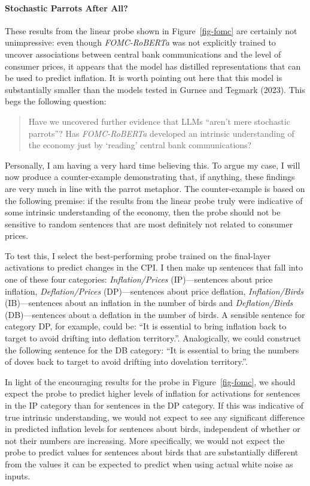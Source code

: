 \documentclass[
  letterpaper,
  DIV=11,
  numbers=noendperiod]{scrartcl}
\let\oldparagraph\paragraph
\renewcommand{\paragraph}[1]{\oldparagraph{#1}\mbox{}}
\theoremstyle{plain}
\theoremstyle{remark}
\begin{document}
\paragraph{Stochastic Parrots After
All?}\label{stochastic-parrots-after-all}

These results from the linear probe shown in Figure~\ref{fig-fomc} are
certainly not unimpressive: even though \emph{FOMC-RoBERTa} was not
explicitly trained to uncover associations between central bank
communications and the level of consumer prices, it appears that the
model has distilled representations that can be used to predict
inflation. It is worth pointing out here that this model is
substantially smaller than the models tested in Gurnee and Tegmark
(2023). This begs the following question:

\begin{quote}
Have we uncovered further evidence that LLMs ``aren't mere stochastic
parrots''? Has \emph{FOMC-RoBERTa} developed an intrinsic understanding
of the economy just by `reading' central bank communications?
\end{quote}

Personally, I am having a very hard time believing this. To argue my
case, I will now produce a counter-example demonstrating that, if
anything, these findings are very much in line with the parrot metaphor.
The counter-example is based on the following premise: if the results
from the linear probe truly were indicative of some intrinsic
understanding of the economy, then the probe should not be sensitive to
random sentences that are most definitely not related to consumer
prices.

To test this, I select the best-performing probe trained on the
final-layer activations to predict changes in the CPI. I then make up
sentences that fall into one of these four categories:
\emph{Inflation/Prices} (IP)---sentences about price inflation,
\emph{Deflation/Prices} (DP)---sentences about price deflation,
\emph{Inflation/Birds} (IB)---sentences about an inflation in the number
of birds and \emph{Deflation/Birds} (DB)---sentences about a deflation
in the number of birds. A sensible sentence for category DP, for
example, could be: ``It is essential to bring inflation back to target
to avoid drifting into deflation territory.''. Analogically, we could
construct the following sentence for the DB category: ``It is essential
to bring the numbers of doves back to target to avoid drifting into
dovelation territory.''.

In light of the encouraging results for the probe in
Figure~\ref{fig-fomc}, we should expect the probe to predict higher
levels of inflation for activations for sentences in the IP category
than for sentences in the DP category. If this was indicative of true
intrinsic understanding, we would not expect to see any significant
difference in predicted inflation levels for sentences about birds,
independent of whether or not their numbers are increasing. More
specifically, we would not expect the probe to predict values for
sentences about birds that are substantially different from the values
it can be expected to predict when using actual white noise as inputs.
\end{document}
